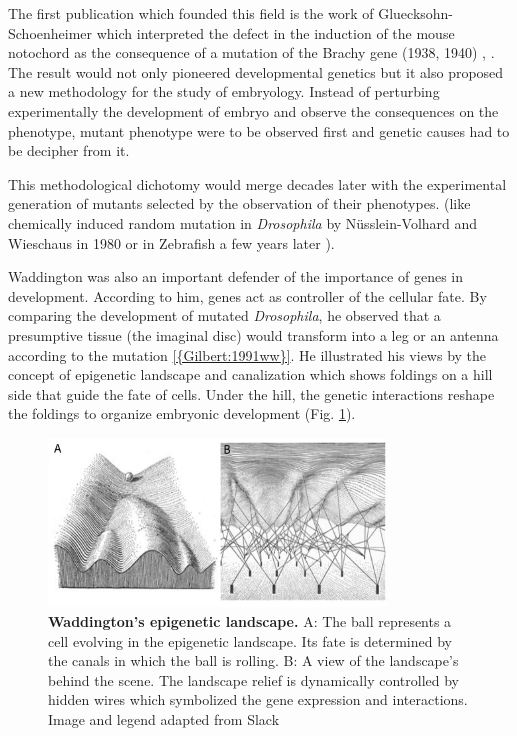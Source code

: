   The first publication which founded this field is the work of Gluecksohn-Schoenheimer which interpreted the defect in the induction of the mouse notochord as the consequence of a mutation of the Brachy gene (1938, 1940) \cite{GluecksohnSchoenheimer:1938vk}, \cite{GluecksohnSchoenheimer:1940wg}. The result would not only pioneered developmental genetics but it also proposed a new methodology for the study of embryology. Instead of perturbing experimentally the development of embryo and observe the consequences on the phenotype, mutant phenotype were to be observed first and genetic causes had to be decipher from it. 

  This methodological dichotomy would merge decades later with the experimental generation of mutants selected by the observation of their phenotypes. (like chemically induced random mutation in \textit{Drosophila} by Nüsslein-Volhard and Wieschaus in 1980 \cite{NussleinVolhard:1980wg} or in Zebrafish a few years later \cite{NussleinVolhard:2012kb}). 

  Waddington was also an important defender of the importance of genes in development. According to him, genes act as controller of the cellular fate. By comparing the development of mutated \textit{Drosophila}, he observed that a presumptive tissue (the imaginal disc) would transform into a leg or an antenna according to the mutation \ref{{Gilbert:1991ww}}. He illustrated his views by the concept of epigenetic landscape and canalization which shows foldings on a hill side that guide the fate of cells. Under the hill, the genetic interactions reshape the foldings to organize embryonic development (Fig. \ref{Development_Review_waddington_epigenetic_nature_mod_small_intro}).  
\begin{figure}
\begin{center}
\includegraphics[width=0.8\textwidth]{../../images/Development_Review/waddington_epigenetic_nature_mod_small.png}
\end{center}
\caption{\textbf{Waddington's epigenetic landscape.} A: The ball represents a cell evolving in the epigenetic landscape. Its fate is determined by the canals in which the ball is rolling. B: A view of the landscape's behind the scene. The landscape relief is dynamically controlled by hidden wires which symbolized the gene expression and interactions. Image and legend adapted from Slack \cite{Slack:2002kg}}
\label{Development_Review_waddington_epigenetic_nature_mod_small_intro}
\end{figure}


